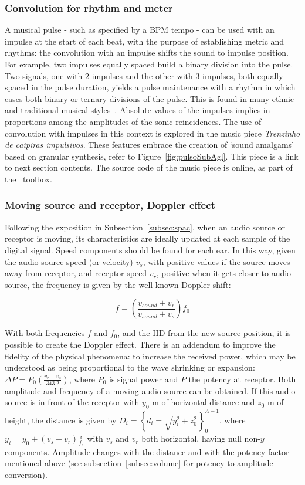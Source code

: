 \subsubsection{Convolution for rhythm and meter}
A musical pulse - such as specified by a BPM
tempo - can be used with an impulse at the start of each beat, with the purpose of establishing metric and rhythms: the convolution with an impulse shifts the sound to impulse position. For example, two impulses equally spaced build a binary division into the
pulse. Two signals, one with 2 impulses and the other with 3 impulses, both equally spaced in the pulse duration, yields a pulse
maintenance with a rhythm in which eases both binary or ternary
divisions of the pulse. This is found in many ethnic and traditional musical styles~\cite{Gramani}. Absolute values of the impulses implies in proportions among the amplitudes of the sonic reincidences. The use of convolution with impulses in this context is explored in the music piece \emph{Trenzinho de caipiras impulsivos}. These features embrace the creation of `sound amalgams' based on granular synthesis, refer to Figure~\ref{fig:pulsoSubAgl}. This piece is a link to next section contents. The source code of the music piece is online, as part of the \massa\ toolbox\cite{MASSA}.


\subsubsection{Moving source and receptor, Doppler effect}

Following the exposition in Subsection~\ref{subsec:spac}, when an audio source or receptor is moving, its characteristics are ideally updated at each sample of the digital signal. Speed components should be found for each ear. In this way, given the audio source speed (or velocity) $v_s$, with positive values if the source moves away from receptor, and receptor speed $v_r$, positive when it gets closer to audio source, the frequency is given by the well-known Doppler shift:

\begin{equation}\label{eq:fDoppler}
    f=\left(\frac{v_{sound}+v_r}{v_{sound}+v_s}\right)f_0
\end{equation}

With both frequencies $f$ and $f_0$, and the IID from the new source
position, it is possible to create the Doppler effect. There is an addendum to improve the fidelity of the physical phenomena: to increase the received power, which may be understood as being proportional to the wave shrinking or expansion: $\Delta P=P_0\left(\frac{v_r-v_s}{343.2}\right)$,
 where $P_0$ is signal power and $P$ the potency at receptor. Both amplitude and frequency of a moving audio source can be obtained. If this audio source is in front of the receptor with $y_0$ m of horizontal distance and $z_0$ m of height, the distance is given by
$D_i=\left\{ d_i=\sqrt{ y_{i}^{2}+z_{0}^{2} } \right\}_0^{\Lambda-1}$,
where $y_i=y_0+(v_s-v_r)\frac{i}{f_s}$ with $v_s$ and $v_r$ both
horizontal, having null non-$y$ components. Amplitude changes with the distance and with the potency factor mentioned above (see subsection~\ref{subsec:volume} for potency to amplitude conversion).

